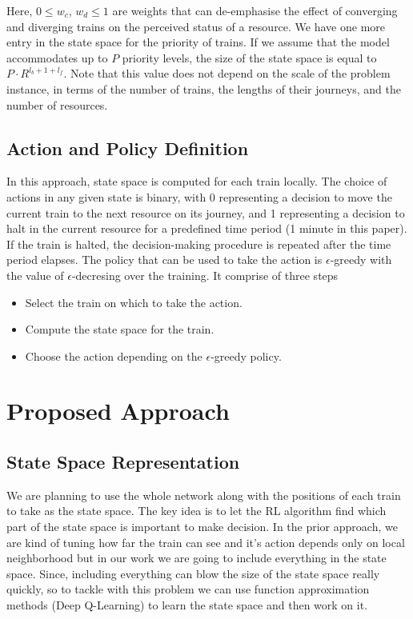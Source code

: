 Here, $0 \leq w_c$, $w_d \leq 1$ are weights that can de-emphasise
the effect of converging and diverging trains on the perceived
status of a resource.
\vspace{0.2cm}
We have one more entry in the state space for the priority of trains. If we assume that the model accommodates
up to $P$ priority levels, the size of the state space is equal to
\textbf { $ P \cdot R^{l_b+1+l_f} $}. Note that this value does not depend on the
scale of the problem instance, in terms of the number of trains,
the lengths of their journeys, and the number of resources.

\subsection {Action and Policy Definition}

In this approach, state space is computed for each train locally. 
The choice of actions in any given state is binary, with
0 representing a decision to move the current train to the next
resource on its journey, and 1 representing a decision to halt
in the current resource for a predefined time period (1 minute
in this paper). If the train is halted, the decision-making
procedure is repeated after the time period elapses.
 The policy that can be used to take the action is $ \epsilon$-greedy with the 
 value of $ \epsilon$-decresing over the training. It comprise of three steps 
 \begin{itemize}
\item Select the train on which to take the action.
\item Compute the state space for the train. 
\item Choose the action depending on the $\epsilon$-greedy policy. 
 \end{itemize}

\section{Proposed Approach}
\subsection {State Space Representation}
We are planning to use the whole network along with the positions of each train to take
as the state space. The key idea is to let the RL algorithm find which part of the state 
space is important to make decision. In the prior approach, we are kind of tuning how far the train can see and it's
action depends only on local neighborhood but in our work we are going to include everything in the state space.
Since, including everything can blow the size of the state space really quickly, so to tackle with this 
problem we can use function approximation methods (Deep Q-Learning) to learn the state space and then 
work on it.
